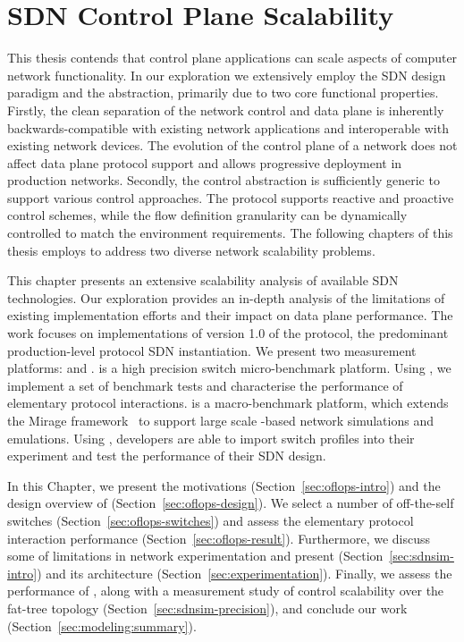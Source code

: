 \chapter{SDN Control Plane Scalability} \label{sec:sdn_scalability} 

This thesis contends that control plane applications can scale aspects of
computer network functionality. In our exploration we extensively employ the SDN
design paradigm and the \of abstraction, primarily due to two core
functional properties.  Firstly, the clean separation of the network control
and data plane is inherently backwards-compatible with existing network
applications and interoperable with existing network devices.  The evolution of
the control plane of a network does not affect data plane protocol support and
allows progressive deployment in production networks.  Secondly, the \of control
abstraction is sufficiently generic to support various control approaches. The
protocol supports reactive and proactive control schemes, while the flow
definition granularity can be dynamically controlled to match the environment
requirements. The following chapters of this thesis employs \of to
address two diverse network scalability problems. 

This chapter presents an extensive scalability analysis of available SDN
technologies. Our exploration provides an in-depth analysis of the limitations
of existing implementation efforts and their impact on data plane performance.
The work focuses on implementations of version 1.0 of the \of protocol, the
predominant production-level protocol SDN instantiation.  We present two
measurement platforms: \oflops and \sdnsim.  \oflops is a high precision \of
switch micro-benchmark platform. Using \oflops, we implement a set of benchmark
tests and characterise the performance of elementary protocol interactions.
\sdnsim is a macro-benchmark \of platform, which extends the Mirage
framework~ to support large scale \of-based network
simulations and emulations.  Using \sdnsim, developers are able to import
\oflops switch profiles into their experiment and test the performance of their
SDN design.

In this Chapter, we present the motivations (Section~\ref{sec:oflops-intro}) and
the design overview of \oflops (Section~\ref{sec:oflops-design}).
We select a number of off-the-self \of switches
(Section~\ref{sec:oflops-switches}) and assess the elementary protocol interaction performance
(Section~\ref{sec:oflops-result}). Furthermore, we discuss some of
limitations in network experimentation and present \sdnsim 
(Section~\ref{sec:sdnsim-intro}) and its architecture
(Section~\ref{sec:experimentation}). Finally, we assess the performance of
\sdnsim, along with a measurement study of control
scalability over the fat-tree topology (Section~\ref{sec:sdnsim-precision}),
and conclude our work (Section~\ref{sec:modeling:summary}). 

